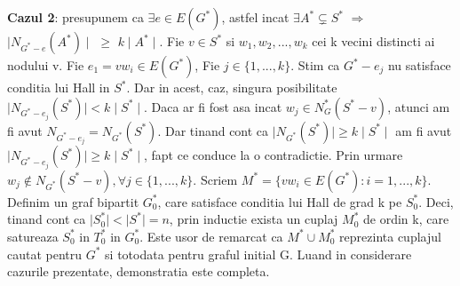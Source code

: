 \documentclass{article}
\begin{document}
\newline
\newline
\textbf{Cazul 2}: presupunem ca $\exists e \in E(G^*)$, astfel incat $\exists A^* \subsetneq S^*$ $\Rightarrow$ $\mid N_{G^*-e}(A^*)\mid$ $\geq $ $k \mid A^*\mid$. Fie $v \in S^*$ si $w_1, w_2, ..., w_k$ cei k vecini distincti ai nodului v. Fie $e_1 = vw_i \in E(G^*)$, Fie $j \in \{1, ..., k\}$.  Stim ca $G^*-e_j$ nu satisface conditia lui Hall in $S^*$. Dar in acest, caz, singura posibilitate $\mid N_{G^*-e_j}(S^*)\mid < k\mid S^*\mid$. Daca ar fi fost asa incat $w_j \in N_G^*(S^*-v)$, atunci am fi avut $N_{G^*-e_j}=N_{G^*}(S^*)$. Dar tinand cont ca $\mid N_{G^*}(S^*)\mid \geq k \mid S^* \mid$ am fi avut $\mid N_{G^*-e_j}(S^*)\mid \geq k\mid S^*\mid$, fapt ce conduce la o contradictie. Prin urmare $w_j \notin N_{G^*}(S^*-v), \forall j \in \{1, ..., k\}$.
\newline
\newline
Scriem $M^* = \{ vw_i \in E(G^*) : i = 1, ..., k \}$. Definim un graf bipartit $G_0^*$, care satisface conditia lui Hall de grad k pe $S_0^*$. Deci, tinand cont ca $\mid S_0^* \mid < \mid S^* \mid = n$, prin inductie exista un cuplaj $M_0^*$ de ordin k, care satureaza $S_0^*$ in $T_0^*$ in $G_0^*$. Este usor de remarcat ca $M^* \cup M_0^*$ reprezinta cuplajul cautat pentru $G^*$ si totodata pentru graful initial G.
Luand in considerare cazurile prezentate, demonstratia este completa.
\end{document}
